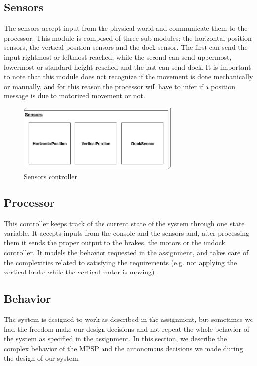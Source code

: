 \subsection{Sensors}

The sensors accept input from the physical world and communicate them to the processor.
This module is composed of three sub-modules: the horizontal position sensors,
the vertical position sensors and the dock sensor.
The first can send the input rightmost or leftmost reached,
while the second can send uppermost, lowermost or standard height reached and
the last can send dock.
It is important to note that this module does not recognize if the movement
is done mechanically or manually, and for this reason the processor will have
to infer if a position message is due to motorized
movement or not.


\begin{figure}[h]
    \centering
    \includegraphics[width=0.7\textwidth]{img/sensors.png}
    \caption{Sensors controller}
\end{figure}

\subsection{Processor}

This controller keeps track of the current state of the system through one state variable.
It accepts inputs from the console and the sensors and, after processing them
it sends the proper output to the brakes, the motors or the undock controller.
It models the behavior requested in the assignment, and takes care of the
complexities related to satisfying the requirements (e.g. not applying the vertical
brake while the vertical motor is moving).

\subsection{Behavior}

The system is designed to work as described in the assignment, but sometimes
we had the freedom make our design decisions and not repeat the whole behavior of the system
as specified in the assignment.
In this section, we describe the complex behavior of the
MPSP and the autonomous decisions we made during the design of our system.

